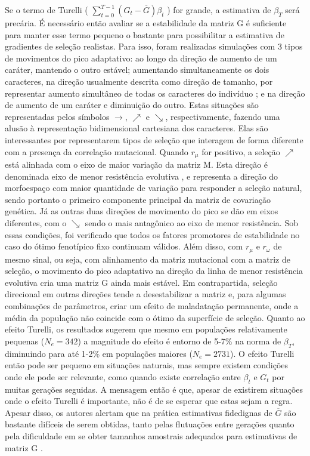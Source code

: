 Se o termo de Turelli (  $\sum_{t=0}^{T-1} (G_t - \overline {G})
\beta_t$ ) for grande, a estimativa de $\beta_T$ será precária. 
É necessário então avaliar se a estabilidade da matriz G é suficiente
para manter esse termo pequeno o bastante para possibilitar a
estimativa de gradientes de seleção realistas. 
Para isso, foram realizadas simulações com 3 tipos de movimentos do pico
adaptativo: ao longo da direção de aumento de um caráter, mantendo o outro
estável; aumentando simultaneamente os dois caracteres, na direção usualmente
descrita como direção de tamanho, por representar aumento simultâneo de
todas os caracteres do indivíduo \citep{Marroig2005}; e na direção de
aumento de um caráter e diminuição do outro. 
Estas situações são representadas pelos símbolos $\rightarrow$,
$\nearrow$ e $\searrow$, respectivamente, fazendo uma alusão à
representação bidimensional cartesiana dos caracteres. 
Elas são interessantes por representarem tipos de seleção que interagem
de forma diferente com a presença da correlação mutacional. 
Quando $r_\mu$ for positivo, a seleção $\nearrow$ está alinhada com o
eixo de maior variação da matriz M. 
Esta direção é denominada eixo de menor resistência evolutiva
\citep{Schluter1996}, e  representa a direção do morfoespaço com maior
quantidade de variação para responder a seleção natural, sendo portanto
o primeiro componente principal da matriz de covariação genética. 
Já as outras duas direções de movimento do pico se dão em eixos
diferentes, com o $\searrow$ sendo o mais antagônico ao eixo de menor
resistência. 
Sob essas condições, foi verificado que todos os fatores promotores de
estabilidade no caso do ótimo fenotípico fixo continuam válidos. 
Além disso, com $r_\mu$ e $r_\omega$ de mesmo sinal, ou seja, com
alinhamento da matriz mutacional com a matriz de seleção, o movimento
do pico adaptativo na direção da linha de menor resistência evolutiva
cria uma matriz G ainda mais estável. 
Em contrapartida, seleção direcional em outras direções tende a
desestabilizar a matriz e, para algumas combinações de parâmetros, criar
um efeito de maladatação permanente, onde a média da população não
coincide com o ótimo da superfície de seleção. 
Quanto ao efeito Turelli, os resultados sugerem que mesmo em populações
relativamente pequenas ($N_e=342$) a magnitude do efeito é entorno de
5-7\% na norma de $\beta_T$, diminuindo para até 1-2\% em populações
maiores ($N_e=2731$). 
O efeito Turelli então pode ser pequeno em situações naturais, mas
sempre existem condições onde ele pode ser relevante, como quando existe
correlação entre $\beta_t$ e $G_t$ por muitas gerações seguidas. 
A mensagem então é que, apesar de existirem situações onde o efeito
Turelli é importante, não é de se esperar que estas sejam a regra. 
Apesar disso, os autores alertam que na prática estimativas fidedignas
de $\overline {G}$ são bastante difíceis de serem obtidas, tanto pelas
flutuações entre gerações quanto pela dificuldade em se obter tamanhos
amostrais adequados para estimativas de matriz G \citep{Marroig2011b}.

